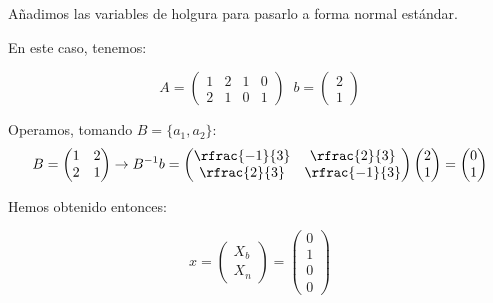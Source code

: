 \begin{example}

\begin{ioprob}
\end{ioprob}

\begin{figure}[h]
\centering
{}
\end{figure}

Añadimos las variables de holgura para pasarlo a forma normal estándar.

\begin{ioprob}
\end{ioprob}

En este caso, tenemos:

\[A = \begin{pmatrix}1&2&1&0\\2&1&0&1\end{pmatrix}\;\; b = \begin{pmatrix}2\\1\end{pmatrix}\]

Operamos, tomando $B = \{a_1,a_2\}$: \[B = \begin{pmatrix}1&2\\2&1\end{pmatrix} \to B^{-1}b = \begin{pmatrix}\rfrac{-1}{3}&\rfrac{2}{3}\\\rfrac{2}{3}&\rfrac{-1}{3}\end{pmatrix}\begin{pmatrix}2\\1\end{pmatrix} = \begin{pmatrix}0\\1\end{pmatrix}\]

Hemos obtenido entonces:

\[x = \begin{pmatrix}X_b\\\hline X_n\end{pmatrix} = \begin{pmatrix}0\\1\\\hline0\\0\end{pmatrix}\]


\end{example}
